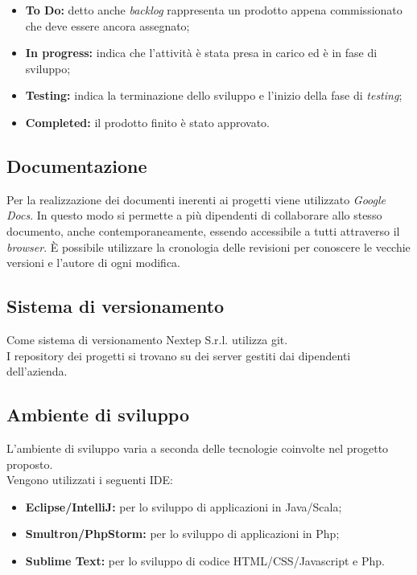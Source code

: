 \begin{itemize}
	\item \textbf{To Do: }detto anche \textit{backlog }rappresenta un prodotto appena commissionato che deve essere ancora assegnato;
	\item \textbf{In progress: }indica che l'attività è stata presa in carico ed è in fase di sviluppo;
	\item \textbf{Testing: }indica la terminazione dello sviluppo e l'inizio della fase di \textit{testing};
	\item \textbf{Completed: }il prodotto finito è stato approvato.
\end{itemize}

\subsection*{Documentazione}
Per la realizzazione dei documenti inerenti ai progetti viene utilizzato \textit{Google Docs}. In questo modo si permette a più dipendenti di collaborare allo stesso documento, anche contemporaneamente, essendo accessibile a tutti attraverso il \textit{browser}. È possibile utilizzare la cronologia delle revisioni per conoscere le vecchie versioni e l'autore di ogni modifica.

\subsection*{Sistema di versionamento}
Come sistema di versionamento Nextep S.r.l. utilizza \gls{git}.\\
I \gls{repository} dei progetti si trovano su dei server gestiti dai dipendenti dell'azienda.

\subsection*{Ambiente di sviluppo}
L'ambiente di sviluppo varia a seconda delle tecnologie coinvolte nel progetto proposto.\\
Vengono utilizzati i seguenti \gls{IDE}:
\begin{itemize}
	\item \textbf{Eclipse/IntelliJ: }per lo sviluppo di applicazioni in Java/Scala;
	\item \textbf{Smultron/PhpStorm: }per lo sviluppo di applicazioni in Php;
	\item \textbf{Sublime Text: }per lo sviluppo di codice HTML/CSS/Javascript e Php.
\end{itemize}

